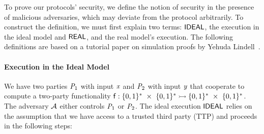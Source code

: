 To prove our protocols' security, we define the notion of security in the presence of malicious adversaries, which may deviate from the protocol arbitrarily.
To construct the definition, we must first explain two terms: $\mathsf{IDEAL}$, the execution in the ideal model and $\mathsf{REAL}$, and the real model's execution.
The following definitions are based on a tutorial paper on simulation proofs by Yehuda Lindell~\cite{lindell2017simulate}.

\paragraph{Execution in the Ideal Model} We have two parties $\mathit{P}_{1}$ with input $\mathit{x}$ and $\mathit{P}_{2}$ with input $\mathit{y}$ that cooperate to compute a two-party functionality $\mathsf{f} : \{0,1\}^{*} ~\times~ \{0,1\}^{*} \rightarrowtail \{0,1\}^{*} ~\times~ \{0,1\}^{*}$.
The adversary $\mathcal{A}$ either controls $\mathit{P}_{1}$ or $\mathit{P}_{2}$.
The ideal execution $\mathsf{IDEAL}$ relies on the assumption that we have access to a trusted third party (TTP) and proceeds in the following steps:


